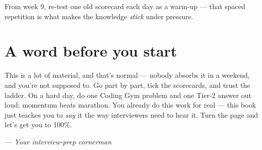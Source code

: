 \noindent From week 9, re-test one old scorecard each day as a warm-up --- that
spaced repetition is what makes the knowledge \emph{stick} under pressure.

\section*{A word before you start}
This is a lot of material, and that's normal --- nobody absorbs it in a weekend,
and you're not supposed to. Go part by part, tick the scorecards, and trust the
ladder. On a hard day, do one Coding Gym problem and one Tier-2 answer out loud;
momentum beats marathon. You already do this work for real --- this book just
teaches you to \emph{say} it the way interviewers need to hear it. Turn the
page and let's get you to 100\%.

\begin{flushright}
\itshape --- Your interview-prep cornerman
\end{flushright}
